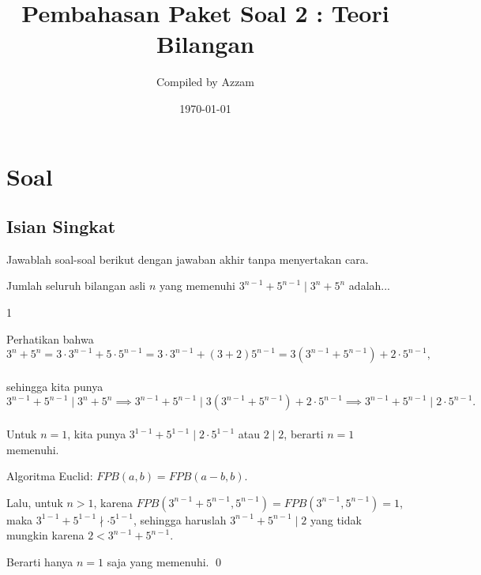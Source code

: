 \documentclass[11pt]{scrartcl}
\begin{document}
	\title{Pembahasan Paket Soal 2 : Teori Bilangan} %
	\date{\today}
	\author{Compiled by Azzam}
	\maketitle
	\newpage
	
	\section{Soal}
\subsection{Isian Singkat}
Jawablah soal-soal berikut dengan jawaban akhir tanpa menyertakan cara.
	
	
	\begin{soalbaru}
		Jumlah seluruh bilangan asli $n$ yang memenuhi $3^{n-1}+5^{n-1} \mid 3^n + 5^{n}$ adalah...
		
		\begin{jawaban}
		1
		\end{jawaban}
		\begin{solusi}
		Perhatikan bahwa\\[-18pt]  $$3^n+5^n = 3\cdot3^{n-1}+5\cdot 5^{n-1} = 3\cdot 3^{n-1}+(3+2)5^{n-1} = 3(3^{n-1}+5^{n-1})+2\cdot 5^{n-1},$$\\[-25pt]sehingga kita punya \\[-15pt]$$3^{n-1}+5^{n-1} \mid 3^n + 5^{n} \implies 3^{n-1}+5^{n-1} \mid 3(3^{n-1}+5^{n-1})+2\cdot 5^{n-1} \implies 3^{n-1}+5^{n-1} \mid 2\cdot 5^{n-1}.$$\\[-20pt]
		Untuk $n=1$, kita punya $3^{1-1}+5^{1-1} \mid 2\cdot 5^{1-1}$ atau $2\mid 2$, berarti $n=1$ memenuhi.
		
		\begin{lemmarev}
		Algoritma Euclid: $FPB(a,b)=FPB(a-b,b).$
		\end{lemmarev}
		
		Lalu, untuk $n >1$, karena $FPB(3^{n-1}+5^{n-1},5^{n-1})=FPB(3^{n-1},5^{n-1})=1$, maka $3^{1-1}+5^{1-1} \nmid \cdot 5^{1-1}$, sehingga haruslah $3^{n-1}+5^{n-1} \mid 2$ yang tidak mungkin karena $2 < 3^{n-1}+5^{n-1}$.
		
		Berarti hanya $n=1$ saja yang memenuhi. \qed
		\end{solusi}
	\end{soalbaru}
	
\end{document}
